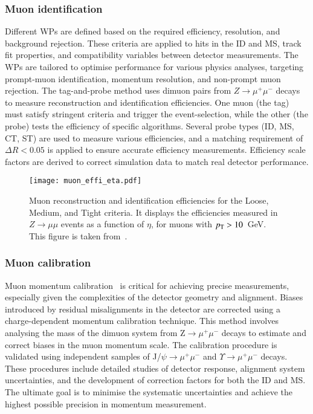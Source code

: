         \subsubsection{Muon identification}
            Different WPs are defined based on the required efficiency, resolution, and background rejection. These criteria are applied to hits 
            in the ID and MS, track fit properties, and compatibility variables between detector measurements. The WPs are tailored to optimise 
            performance for various physics analyses, targeting prompt-muon identification, momentum resolution, and non-prompt muon rejection.
            The tag-and-probe method uses dimuon pairs from $Z\rightarrow \mu^+\mu^-$ decays to measure reconstruction and identification 
            efficiencies. One muon (the tag) must satisfy stringent criteria and trigger the event-selection, while the other (the probe) tests 
            the efficiency of specific algorithms. Several probe types (ID, MS, CT, ST) are used to measure various efficiencies, and a matching 
            requirement of $\Delta R < 0.05$ is applied to ensure accurate efficiency measurements. Efficiency scale factors are derived to correct 
            simulation data to match real detector performance.
            \begin{figure}[htbp]
                \centering
                \texttt{[image: muon\_effi\_eta.pdf]}
                \caption{
                    Muon reconstruction and identification efficiencies for the Loose, Medium, and Tight criteria. It displays the efficiencies measured in $Z\rightarrow\mu\mu$ events as a function of $\eta$, for muons with $p_{\text{T}}>10$~GeV. 
                    This figure is taken from~\cite{MUON-2018-03}.
                }
                \label{fig:muon_effi}
            \end{figure}
        
        \subsubsection{Muon calibration}
            Muon momentum calibration~\cite{MUON-2022-01} is critical for achieving precise measurements, especially given the complexities of the detector geometry and alignment.
            Biases introduced by residual misalignments in the detector are corrected using a charge-dependent momentum calibration technique. This method
            involves analysing the mass of the dimuon system from Z$\rightarrow \mu^+\mu^-$ decays to estimate and correct biases in the muon momentum
            scale. The calibration procedure is validated using independent samples of J/$\psi\rightarrow\mu^+\mu^-$ and $\Upsilon\rightarrow\mu^+\mu^-$ decays.
            These procedures include detailed studies of detector response, alignment system uncertainties, and the development of correction factors for both the ID and MS.
            The ultimate goal is to minimise the systematic uncertainties and achieve the highest possible precision in momentum measurement.
        

